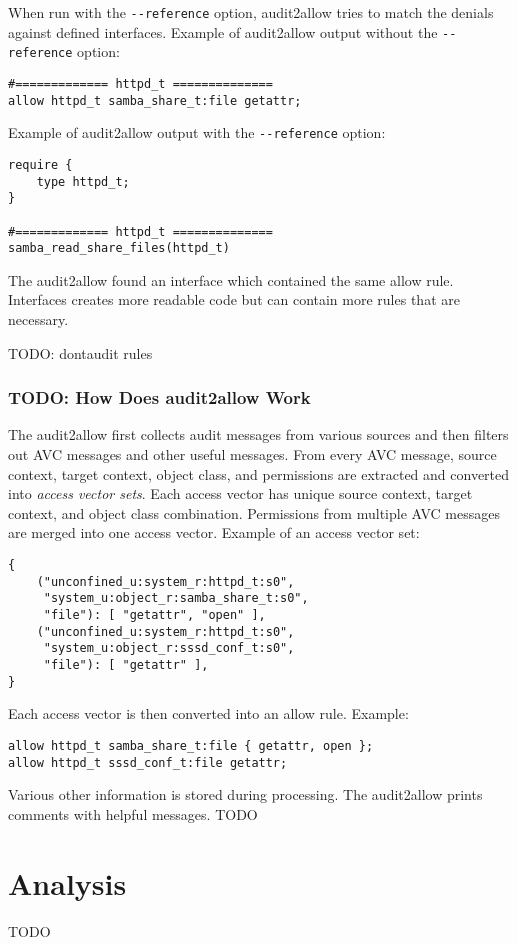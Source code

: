 When run with the \texttt{-{}-reference} option, audit2allow tries to match the
denials against defined interfaces. Example of audit2allow output without the
\texttt{-{}-reference} option:
\begin{lstlisting}
#============= httpd_t ==============
allow httpd_t samba_share_t:file getattr;
\end{lstlisting}
Example of audit2allow output with the \texttt{-{}-reference} option:
\begin{lstlisting}
require {
	type httpd_t;
}

#============= httpd_t ==============
samba_read_share_files(httpd_t)
\end{lstlisting}
The audit2allow found an interface which contained the same allow
rule. Interfaces creates more readable code but can contain more rules that are
necessary.

TODO: dontaudit rules

\subsection{TODO: How Does audit2allow Work}
The audit2allow first collects audit messages from various sources and then
filters out AVC messages and other useful messages. From every AVC message,
source context, target context, object class, and permissions are extracted and
converted into \emph{access vector sets}. Each access vector has unique source
context, target context, and object class combination. Permissions from multiple
AVC messages are merged into one access vector. Example of an access vector set:
\begin{lstlisting}
{
    ("unconfined_u:system_r:httpd_t:s0",
     "system_u:object_r:samba_share_t:s0",
     "file"): [ "getattr", "open" ],
    ("unconfined_u:system_r:httpd_t:s0",
     "system_u:object_r:sssd_conf_t:s0",
     "file"): [ "getattr" ],
}
\end{lstlisting}

Each access vector is then converted into an allow rule. Example:
\begin{lstlisting}
allow httpd_t samba_share_t:file { getattr, open };
allow httpd_t sssd_conf_t:file getattr;
\end{lstlisting}

Various other information is stored during processing. The audit2allow prints
comments with helpful messages. TODO

\chapter{Analysis}
TODO


